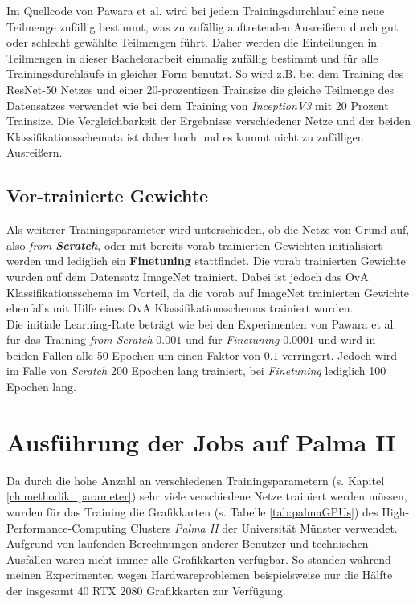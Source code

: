 Im Quellcode von Pawara et al. \cite{pawaraWebsiteCode} wird bei jedem Trainingsdurchlauf eine neue Teilmenge zufällig bestimmt, was zu zufällig auftretenden Ausreißern durch gut oder schlecht gewählte Teilmengen führt.
Daher werden die Einteilungen in Teilmengen in dieser Bachelorarbeit einmalig zufällig bestimmt und für alle Trainingsdurchläufe in gleicher Form benutzt. So wird z.B. bei dem Training des ResNet-50 Netzes und einer 20-prozentigen Trainsize die gleiche Teilmenge des Datensatzes verwendet wie bei dem Training von \textit{InceptionV3} mit 20 Prozent Trainsize. Die Vergleichbarkeit der Ergebnisse verschiedener Netze und der beiden Klassifikationsschemata ist daher hoch und es kommt nicht zu zufälligen Ausreißern.

\subsection{Vor-trainierte Gewichte}
\label{ch:methodik_gewichte}
Als weiterer Trainingsparameter wird unterschieden, ob die Netze von Grund auf, also \textit{from \textbf{Scratch}}, oder mit bereits vorab trainierten Gewichten initialisiert werden und lediglich ein \textbf{Finetuning} stattfindet. Die vorab trainierten Gewichte wurden auf dem Datensatz ImageNet \cite{imagenet} trainiert.
Dabei ist jedoch das OvA Klassifikationsschema im Vorteil, da die vorab auf ImageNet \cite{imagenet} trainierten Gewichte ebenfalls mit Hilfe eines OvA Klassifikationsschemas trainiert wurden.\\

Die initiale Learning-Rate beträgt wie bei den Experimenten von Pawara et al. \cite{pawaraPaper} für das Training \textit{from Scratch} $0.001$ und für \textit{Finetuning} $0.0001$ und wird in beiden Fällen alle 50 Epochen um einen Faktor von $0.1$ verringert. Jedoch wird im Falle von \textit{Scratch} 200 Epochen lang trainiert, bei \textit{Finetuning} lediglich 100 Epochen lang.



\section{Ausführung der Jobs auf Palma II}
\label{ch:methodik_palma}
Da durch die hohe Anzahl an verschiedenen Trainingsparametern (s. Kapitel \ref{ch:methodik_parameter}) sehr viele verschiedene Netze trainiert werden müssen, wurden für das Training die Grafikkarten (s. Tabelle \ref{tab:palmaGPUs}) des High-Performance-Computing Clusters \textit{Palma II} der Universität Münster \cite{palma2} verwendet.\\
Aufgrund von laufenden Berechnungen anderer Benutzer und technischen Ausfällen waren nicht immer alle Grafikkarten verfügbar. So standen während meinen Experimenten wegen Hardwareproblemen beispielsweise nur die Hälfte der insgesamt 40 RTX 2080 Grafikkarten zur Verfügung.

